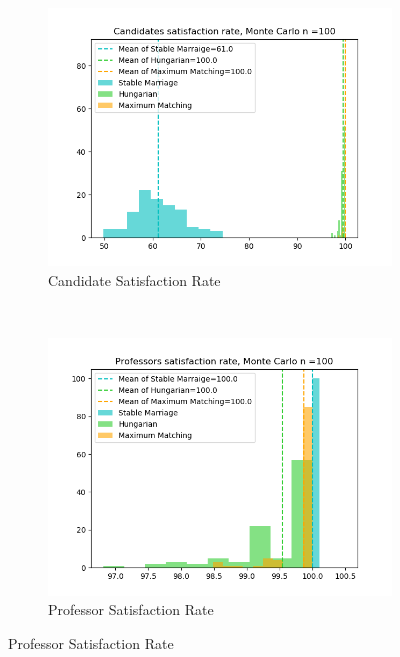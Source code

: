 \documentclass[twoside,twocolumn]{article}
\begin{document}
    \begin{figure}[t]
        \centering
        \begin{subfigure}{0.32\textwidth}
            \centering
            \includegraphics[width=\textwidth]{../figures/300candidates_50courses_100simulations/can_rate.png}
            \caption{Candidate Satisfaction Rate}
        \end{subfigure}%
        ~
        \begin{subfigure}{0.32\textwidth}
            \centering
            \includegraphics[width=\textwidth]{../figures/300candidates_50courses_100simulations/prof_rate.png}
            \caption{Professor Satisfaction Rate}
        \end{subfigure}

\end{figure}
\end{document}
